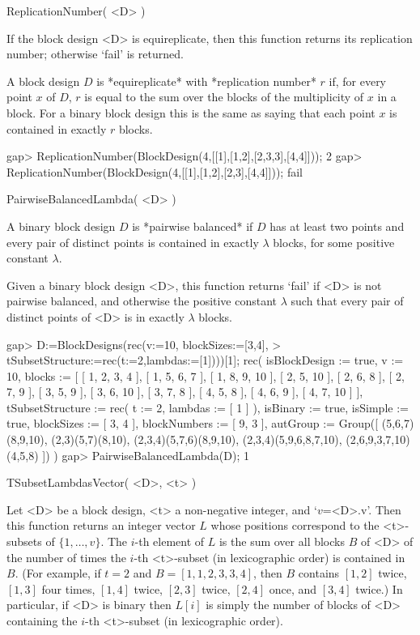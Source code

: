 \>ReplicationNumber( <D> )
 
If the block design <D> is equireplicate, then this function returns
its replication number; otherwise `fail' is returned.

A block design $D$ is *equireplicate* with *replication number* $r$ if,
for every point $x$ of $D$, $r$ is equal to the sum over the blocks of
the multiplicity of $x$ in a block. For a binary block design this is
the same as saying that each point $x$ is contained in exactly $r$ blocks.

\beginexample
gap> ReplicationNumber(BlockDesign(4,[[1],[1,2],[2,3,3],[4,4]]));
2
gap> ReplicationNumber(BlockDesign(4,[[1],[1,2],[2,3],[4,4]]));  
fail
\endexample



\>PairwiseBalancedLambda( <D> )
 
A binary block design $D$ is *pairwise balanced* if $D$ has at least two
points and every pair of distinct points is contained in exactly $\lambda$
blocks, for some positive constant $\lambda$.

Given a binary block design <D>, this function returns `fail' if <D> is
not pairwise balanced, and otherwise the positive constant $\lambda$ such
that every pair of distinct points of <D> is in exactly $\lambda$ blocks.

\beginexample
gap> D:=BlockDesigns(rec(v:=10, blockSizes:=[3,4],       
>          tSubsetStructure:=rec(t:=2,lambdas:=[1])))[1];
rec( isBlockDesign := true, v := 10, 
  blocks := [ [ 1, 2, 3, 4 ], [ 1, 5, 6, 7 ], [ 1, 8, 9, 10 ], [ 2, 5, 10 ], 
      [ 2, 6, 8 ], [ 2, 7, 9 ], [ 3, 5, 9 ], [ 3, 6, 10 ], [ 3, 7, 8 ], 
      [ 4, 5, 8 ], [ 4, 6, 9 ], [ 4, 7, 10 ] ], 
  tSubsetStructure := rec( t := 2, lambdas := [ 1 ] ), isBinary := true, 
  isSimple := true, blockSizes := [ 3, 4 ], blockNumbers := [ 9, 3 ], 
  autGroup := Group([ (5,6,7)(8,9,10), (2,3)(5,7)(8,10), 
      (2,3,4)(5,7,6)(8,9,10), (2,3,4)(5,9,6,8,7,10), (2,6,9,3,7,10)(4,5,8) ]) 
 )
gap> PairwiseBalancedLambda(D);                          
1
\endexample



\>TSubsetLambdasVector( <D>, <t> )

Let <D> be a block design, <t> a non-negative integer, and 
`$v$=<D>.v'. Then this function returns an integer vector $L$ 
whose positions correspond to the <t>-subsets of $\{1,\ldots,v\}$.
The $i$-th element of $L$ is the sum over all blocks $B$ of <D> 
of the number of times the $i$-th <t>-subset (in lexicographic order) 
is contained in $B$. (For example, if $t=2$ and $B=[1,1,2,3,3,4]$, then
$B$ contains $[1,2]$ twice, $[1,3]$ four times, $[1,4]$ twice,
$[2,3]$ twice, $[2,4]$ once, and $[3,4]$ twice.) In particular, 
if <D> is binary then $L[i]$ is simply the number of blocks of <D> 
containing the $i$-th <t>-subset (in lexicographic order).
 
